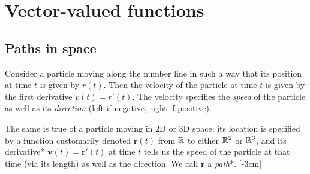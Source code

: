 \documentclass{watsonbook}
\begin{document}
\section{Vector-valued functions} \label{sec:motion_in_space}

\subsection{Paths in space}

Consider a particle moving along the number line in such a way that
its position at time $t$ is given by $r(t)$. Then the velocity of the
particle at time $t$ is given by the first derivative $v(t) =
r'(t)$. The velocity specifies the \textit{speed} of the particle as well as
its \textit{direction} (left if negative, right if positive).

The same is true of a particle moving in 2D or 3D space: its location
is specified by a function customarily denoted $\mathbf{r}(t)$ from
$\mathbb{R}$ to either $\mathbb{R}^2$ or $\mathbb{R}^3$, and its derivative*
$\mathbf{v}(t) = \mathbf{r}'(t)$ at time $t$ tells us the speed of the
particle at that time (via its length) as well as the direction. We
call $\mathbf{r}$ a \textit{path}*. [-3cm] 
\end{document}
